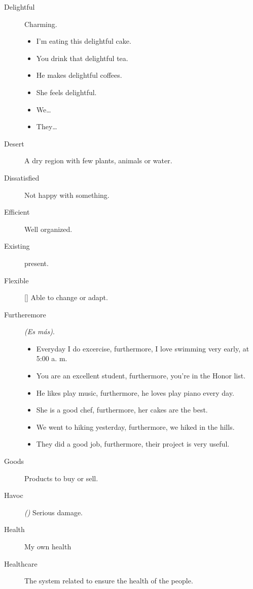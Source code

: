 \begin{multicols}{2}
\begin{description}
\item[Delightful] Charming.
\begin{itemize}
\item I'm eating this delightful cake.
\item You drink that delightful tea.
\item He makes delightful coffees.
\item She feels delightful.
\item We\dots
\item They\dots
\end{itemize}

\item[Desert] A dry region with few plants, animals or water.

\item[Dissatisfied] Not happy with something.

\item[Efficient] Well organized.

\item[Existing] present.

\item[Flexible] [\emph{}] Able to change or adapt.

\item[Furtheremore] \emph{(Es más)}.
\begin{itemize}
\item Everyday I do excercise, furthermore, I love swimming very early, at 5:00 a. m.
\item You are an excellent student, furthermore, you're in the Honor list.
\item He likes play music, furthermore, he loves play piano every day.
\item She is a good chef, furthermore, her cakes are the best.
\item We went to hiking yesterday, furthermore, we hiked in the hills.
\item They did a good job, furthermore, their project is very useful.
\end{itemize}

\item[Goods] Products to buy or sell.

\item[Havoc] \emph{()} Serious damage.

\item[Health] My own health

\item[Healthcare] The system related to ensure the health of the people.


\end{description}
\end{multicols}
